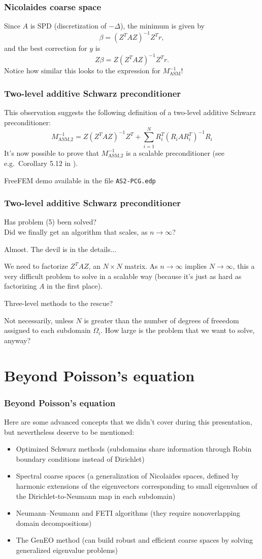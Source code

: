 \documentclass{beamer}
\begin{document}
\begin{frame}
\frametitle{Nicolaides coarse space}
Since $A$ is SPD (discretization of $-\Delta$), the minimum is given by
\[
\beta = (Z^TAZ)^{-1} Z^T r,
\]
and the best correction for $y$ is
\[
Z\beta = Z (Z^TAZ)^{-1} Z^T r.
\]
Notice how similar this looks to the expression for $M_\text{ASM}^{-1}$!
\end{frame}

\begin{frame}
\frametitle{Two-level additive Schwarz preconditioner}
This observation suggests the following definition of a two-level
additive Schwarz preconditioner:
\[
M_\text{ASM,2}^{-1} = Z (Z^TAZ)^{-1} Z^T + \sum_{i=1}^N R_i^T (R_i A R_i^T)^{-1} R_i
\]
It's now possible to prove that $M_\text{ASM,2}^{-1}$ is a scalable preconditioner
(see e.g.\ Corollary 5.12 in \cite{nataf}).

FreeFEM demo available in the file \texttt{AS2-PCG.edp}
\end{frame}

\begin{frame}
\frametitle{Two-level additive Schwarz preconditioner}
Has problem (5) been solved? \\
Did we finally get an algorithm that scales, as $n \to \infty$?
\pause

Almost. The devil is in the details...
\pause

We need to factorize $Z^TAZ$, an $N \times N$ matrix.
As $n \to \infty$ implies $N \to \infty$, this a very difficult problem
to solve in a scalable way (because it's just as hard as factorizing $A$
in the first place).
\pause

Three-level methods to the rescue?
\pause

Not necessarily, unless $N$ is greater than the number of degrees of freeedom
assigned to each subdomain $\Omega_i$.
How large is the problem that we want to solve, anyway?
\end{frame}

\section{Beyond Poisson's equation}
\begin{frame}
\frametitle{Beyond Poisson's equation}
Here are some advanced concepts that we didn't cover during this presentation,
but nevertheless deserve to be mentioned:
\begin{itemize}
\item Optimized Schwarz methods (subdomains share information through
	Robin boundary conditions instead of Dirichlet)
\item Spectral coarse spaces (a generalization of Nicolaides spaces, defined
	by harmonic extensions of the eigenvectors corresponding
	to small eigenvalues of the Dirichlet-to-Neumann map in each subdomain)
\item Neumann–Neumann and FETI algorithms (they require
	nonoverlapping domain decompositions)
\item The GenEO method (can build robust and efficient coarse spaces
	by solving generalized eigenvalue problems)
\end{itemize}
\end{frame}
\end{document}
